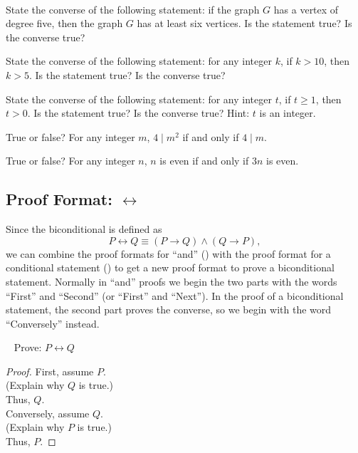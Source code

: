 \begin{act}
\label{act_converse_iff}
~
    \begin{actpart}
        \item State the converse of the following statement: if the graph $G$ has a vertex of degree five, then the graph $G$ has at least six vertices. Is the statement true?  Is the converse true?
        \item \label{part_converse_105} State the converse of the following statement: for any integer $k$, if $k >10$, then $k > 5$. Is the statement true?  Is the converse true?
        \item \label{part_pos_one} State the converse of the following statement:  for any integer $t$, if $t \ge 1$, then $t >0$.  Is the statement true? Is the converse true?  Hint: $t$ is an integer.
        \item \label{part_iff_nsqmult4} True or false?  For any integer $m$, $4 \mid m^2$ if and only if $4 \mid m$.
        \item \label{part_iff_3neven} True or false?  For any integer $n$, $n$ is even if and only if $3n$ is even.
    \end{actpart}
\end{act}

\newcommand{\subpffiff}{Proof Format: $\leftrightarrow$}
\subsection{\subpffiff}
\label{sub_pff_iff}

Since the biconditional is defined as $$P \leftrightarrow Q \equiv (P \to Q) \land (Q \to P),$$ we can combine the proof formats for ``and'' () with the proof format for a conditional statement () to get a new proof format to prove a biconditional statement.  Normally in ``and'' proofs we begin the two parts with the words ``First'' and ``Second'' (or ``First'' and ``Next''). In the proof of a biconditional statement, the second part proves the converse, so we begin with the word ``Conversely'' instead.

\begin{pff}
\label{pff_iff} 
~
    Prove: $P \leftrightarrow Q$ 
    \begin{proof}
        First, assume $P$. \\
        (Explain why $Q$ is true.) \\
        Thus, $Q$. \\
        Conversely, assume $Q$. \\
        (Explain why $P$ is true.) \\
        Thus, $P$.
    \end{proof}    
\end{pff}

